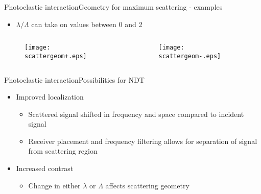 \documentclass[11pt]{beamer}
\begin{document}
	\begin{frame}{Photoelastic interaction}{Geometry for maximum scattering - examples}
		\begin{itemize}
			\item $\lambda/\Lambda$ can take on values between 0 and 2
		\end{itemize}
		\begin{columns}
			\begin{column}{0.5\textwidth}
				\begin{figure}
					\centering
					\texttt{[image: scattergeom+.eps]}
				\end{figure}
			\end{column}
			\begin{column}{0.5\textwidth}
				\begin{figure}
					\centering
					\texttt{[image: scattergeom-.eps]}
				\end{figure}
			\end{column}
		\end{columns}
	\end{frame}
	
	\begin{frame}{Photoelastic interaction}{Possibilities for NDT}
		\pause
		\begin{itemize}
			\item Improved localization
			\begin{itemize}
				\item Scattered signal shifted in frequency and space compared to incident signal
				\item Receiver placement and frequency filtering allows for separation of signal from scattering region
			\end{itemize} \pause
			\item Increased contrast
			\begin{itemize}
				\item Change in either $\lambda$ or $\Lambda$ affects scattering geometry
			\end{itemize}
		\end{itemize}
	\end{frame}
	
\end{document}
